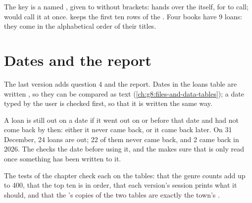 The key is a named , given to  without brackets:
 hands over the  itself, for
 to call;  would call it at once.
\code{[:10]} keeps the first ten rows of the . Four books have 9
loans: they come in the alphabetical order of their titles.

\section{Dates and the report}

The last version adds question 4 and the report. Dates in the loans table are
written , so they can be compared as text
(\cref{ch:g8:files-and-data-tables}); a date typed by the user is checked
first, so that it is written the same way.

\label{lst:g8:project-data-explorer:v5}

\label{lst:g8:project-data-explorer:v5-main}

\label{out:g8:project-data-explorer:v5}

A loan is still out on a date if it went out on or before that date and had
not come back by then: either it never came back, or it came back later. On 31
December, 24 loans are out; 22 of them never came back, and 2 came back in
2026. The  checks the date before using it, and the 
 makes sure that  is only read once something has
been written to it.

The tests of the chapter check each  on the tables: that the genre
counts add up to 400, that the top ten is in order, that each version's
session prints what it should, and that the 's copies of the two
tables are exactly the town's .

